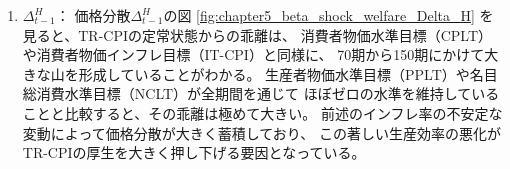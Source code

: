 \begin{enumerate}
        この全期間を通じたインフレ率の不安定な変動が、次項で述べる価格分散の蓄積をもたらし、
        結果として厚生を悪化させる要因となっている。
    \item
    \label{itm:chapter5_beta_shock_policies_tr_cpi_Delta_t_minus_1_H}
        \(\Delta_{t-1}^H\)：
        価格分散\(\Delta_{t-1}^H\)の図
        \ref{fig:chapter5_beta_shock_welfare_Delta_H}
        を見ると、TR-CPIの定常状態からの乖離は、
        消費者物価水準目標（CPLT）や消費者物価インフレ目標（IT-CPI）と同様に、
        70期から150期にかけて大きな山を形成していることがわかる。
        生産者物価水準目標（PPLT）や名目総消費水準目標（NCLT）が全期間を通じて
        ほぼゼロの水準を維持していることと比較すると、その乖離は極めて大きい。
        前述のインフレ率の不安定な変動によって価格分散が大きく蓄積しており、
        この著しい生産効率の悪化がTR-CPIの厚生を大きく押し下げる要因となっている。
\end{enumerate}
